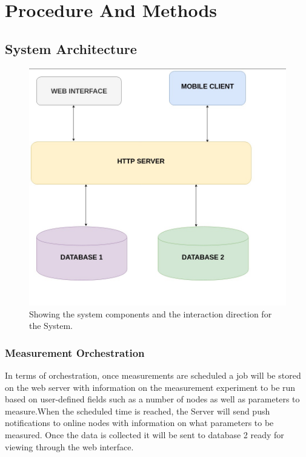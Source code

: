 \section{Procedure And Methods}
\subsection{System Architecture}
\begin{figure}
	\begin{center}
		\includegraphics[width=1\linewidth]{res/system.jpeg}
	\end{center}
	\caption{Showing the system components and the interaction direction for the System.}
	\label{fig-ffsm}
\end{figure}
\subsubsection{Measurement Orchestration}
In terms of orchestration, once measurements are scheduled a job will be stored on the web server with information on the measurement experiment to be run based on user-defined fields such as a number of nodes as well as parameters to measure.When the scheduled time is reached, the Server will send push notifications to online nodes with information on what parameters to be measured. Once the data is collected it will be sent to database 2 ready for viewing through the web interface.
